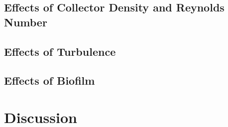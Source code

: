 \documentclass{article}
\begin{document}
\subsection{Effects of Collector Density and Reynolds Number}

\subsection{Effects of Turbulence}

\subsection{Effects of Biofilm}

\section{Discussion}
\end{document}
